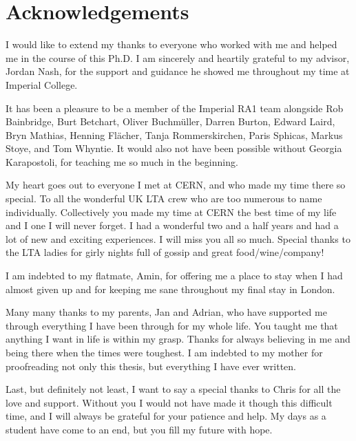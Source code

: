 \chapter*{Acknowledgements}


\normalsize

I would like to extend my thanks to everyone who worked with me and helped me in the course of this Ph.D. I am sincerely and heartily grateful to my advisor, Jordan Nash, for the support and guidance he showed me throughout my time at Imperial College.

It has been a pleasure to be a member of the Imperial RA1 team alongside Rob Bainbridge, Burt Betchart, Oliver Buchm\"uller, Darren Burton, Edward Laird, Bryn Mathias, Henning Fl\"acher, Tanja Rommerskirchen, Paris Sphicas, Markus Stoye, and Tom Whyntie. It would also not have been possible without Georgia Karapostoli, for teaching me so much in the beginning. 

My heart goes out to everyone I met at CERN, and who made my time there so special. To all the wonderful UK LTA crew who are too numerous to name individually. Collectively you made my time at CERN the best time of my life and I one I will never forget. I had a wonderful two and a half years and had a lot of new and exciting experiences. I will miss you all so much. Special thanks to the LTA ladies for girly nights full of gossip and great food/wine/company! 

I am indebted to my flatmate, Amin, for offering me a place to stay when I had almost given up and for keeping me sane throughout my final stay in London. 

Many many thanks to my parents, Jan and Adrian, who have supported me through everything I have been through for my whole life. You taught me that anything I want in life is within my grasp. Thanks for always believing in me and being there when the times were toughest. I am indebted to my mother for proofreading not only this thesis, but everything I have ever written.  

Last, but definitely not least, I want to say a special thanks to Chris for all the love and support. Without you I would not have made it though this difficult time, and I will always be grateful for your patience and help. My days as a student have come to an end, but you fill my future with hope. 

